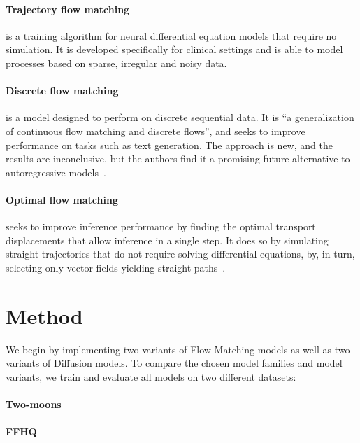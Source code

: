 \documentclass{article}
\begin{document}
\paragraph{Trajectory flow matching} is a training algorithm for neural differential equation models that require no simulation. It is developed specifically for clinical settings and is able to model processes based on sparse, irregular and noisy data. \cite{zhang2024trajectory}

\paragraph{Discrete flow matching} is a model designed to perform on discrete sequential data. It is ``a generalization of continuous flow matching and discrete flows'', and seeks to improve performance on tasks such as text generation. The approach is new, and the results are inconclusive, but the authors find it a promising future alternative to autoregressive models~\cite{gat2024discrete}.

\paragraph{Optimal flow matching} seeks to improve inference performance by finding the optimal transport displacements that allow inference in a single step. It does so by simulating straight trajectories that do not require solving differential equations, by, in turn, selecting only vector fields yielding straight paths~\cite{kornilov2024optimal}.

\section{Method}

We begin by implementing two variants of Flow Matching models as well as two variants of Diffusion models. To compare the chosen model families and model variants, we train and evaluate all models on two different datasets:

\paragraph{Two-moons}

\paragraph{FFHQ}




\end{document}
